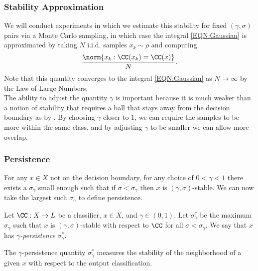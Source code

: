 \begin{frame}
  \frametitle{Stability Approximation}
  We will conduct experiments in which we estimate this stability for fixed $(\gamma,\sigma)$ pairs via a Monte Carlo sampling, in which case the integral \eqref{EQN:Gaussian} is approximated by taking $N$ i.i.d. samples $x_k \sim \rho$ and computing
 \[
     \frac{\norm{x_k : \CC(x_k) = \CC(x)}}{N}.
 \]
 Note that this quantity converges to the integral \eqref{EQN:Gaussian} as $N\to\infty$ by the Law of Large Numbers.\\

 The ability to adjust the quantity $\gamma$ is important because it is much weaker than a notion of stability that requires a ball that stays away from the decision boundary as by \citet{khoury2018}. By choosing $\gamma$ closer to $1$, we can require the samples to be more within the same class, and by adjusting $\gamma$ to be smaller we can allow more overlap.

\end{frame}
\begin{frame}
  \frametitle{Persistence}
  
  For any $x\in X$ not on the decision boundary, for any choice of $0<\gamma<1$ there exists a $\sigma_\gamma$ small enough such that if $\sigma < \sigma_\gamma$ then $x$ is $(\gamma,\sigma)$-stable. We can now take the largest such $\sigma_\gamma$ to define persistence.

 \begin{definition}
     Let $\CC:X\to L$ be a classifier, $x \in X$, and $\gamma\in(0,1)$. Let $\sigma_\gamma^*$ be the maximum $\sigma_\gamma$ such that $x$ is $(\gamma, \sigma)$-stable with respect to $\CC$ for all $\sigma<\sigma_\gamma$. We say that $x$ has \emph{$\gamma$-persistence} $\sigma_\gamma^*$.
 \end{definition}

The $\gamma$-persistence quantity $\sigma_\gamma^*$ measures the
stability of the neighborhood of a given $x$ with respect to the
output classification.
\end{frame}

